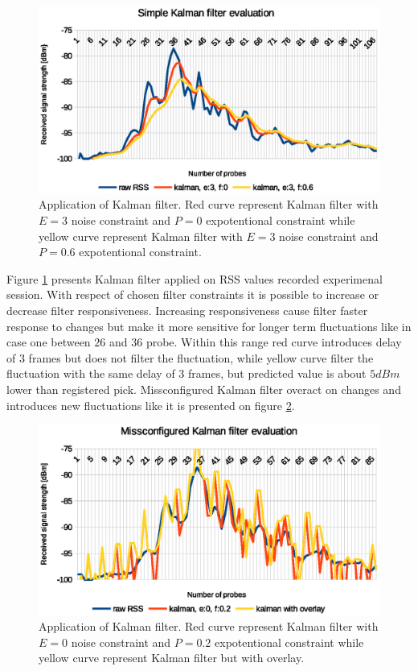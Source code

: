 \documentclass[../main.tex]{subfiles}
\begin{document}
\begin{figure}[!htbp]
\includegraphics[width=\textwidth]{pictures/filtering_simple_kalman}
\centering
\caption{Application of Kalman filter. Red curve represent Kalman filter with $E=3$ noise constraint and $P=0$ expotentional constraint while yellow curve represent Kalman filter with $E=3$ noise constraint and $P=0.6$ expotentional constraint. }
\label{fig:filtering_simple_kalman}
\end{figure}

Figure \ref{fig:filtering_simple_kalman} presents Kalman filter applied on RSS values recorded experimenal session. With respect of chosen filter constraints it is possible to increase or decrease filter responsiveness. Increasing responsiveness cause filter faster response to changes but make it more sensitive for longer term fluctuations like in case one between $26$ and $36$ probe. Within this range red curve introduces delay of $3$ frames but does not filter the fluctuation, while yellow curve filter the fluctuation with the same delay of $3$ frames, but predicted value is about $5dBm$ lower than registered pick. Missconfigured Kalman filter overact on changes and introduces new fluctuations like it is presented on figure \ref{fig:filtering_simple_kalman_missconfigured}.

\begin{figure}[!htbp]
\includegraphics[width=\textwidth]{pictures/filtering_simple_kalman_missconfigured}
\centering
\caption{Application of Kalman filter. Red curve represent Kalman filter with $E=0$ noise constraint and $P=0.2$ expotentional constraint while yellow curve represent Kalman filter but with overlay. }
\label{fig:filtering_simple_kalman_missconfigured}
\end{figure}
\end{document}
